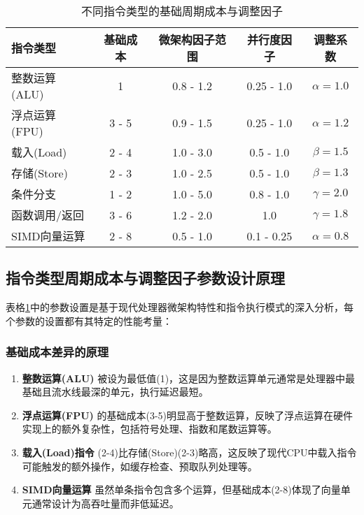 \documentclass[bachelor]{thesis-uestc}
\begin{document}
\begin{table}[htbp]
\caption{不同指令类型的基础周期成本与调整因子}
\centering
\begin{tabular}{|l|c|c|c|c|}
\hline
\textbf{指令类型} & \textbf{基础成本} & \textbf{微架构因子范围} & \textbf{并行度因子} & \textbf{调整系数} \\
\hline
整数运算(ALU) & 1 & 0.8 - 1.2 & 0.25 - 1.0 & $\alpha = 1.0$ \\
\hline
浮点运算(FPU) & 3 - 5 & 0.9 - 1.5 & 0.25 - 1.0 & $\alpha = 1.2$ \\
\hline
载入(Load) & 2 - 4 & 1.0 - 3.0 & 0.5 - 1.0 & $\beta = 1.5$ \\
\hline
存储(Store) & 2 - 3 & 1.0 - 2.5 & 0.5 - 1.0 & $\beta = 1.3$ \\
\hline
条件分支 & 1 - 2 & 1.0 - 5.0 & 0.8 - 1.0 & $\gamma = 2.0$ \\
\hline
函数调用/返回 & 3 - 6 & 1.2 - 2.0 & 1.0 & $\gamma = 1.8$ \\
\hline
SIMD向量运算 & 2 - 8 & 0.5 - 1.0 & 0.1 - 0.25 & $\alpha = 0.8$ \\
\hline
\end{tabular}
\label{tab:instr_costs}
\end{table}

\subsection{指令类型周期成本与调整因子参数设计原理}

表格\ref{tab:instr_costs}中的参数设置是基于现代处理器微架构特性和指令执行模式的深入分析，每个参数的设置都有其特定的性能考量：

\subsubsection{基础成本差异的原理}

\begin{enumerate}
    \item \textbf{整数运算(ALU)} 被设为最低值(1)，这是因为整数运算单元通常是处理器中最基础且流水线最深的单元，执行延迟最短。
    
    \item \textbf{浮点运算(FPU)} 的基础成本(3-5)明显高于整数运算，反映了浮点运算在硬件实现上的额外复杂性，包括符号处理、指数和尾数运算等。
    
    \item \textbf{载入(Load)指令} (2-4)比存储(Store)(2-3)略高，这反映了现代CPU中载入指令可能触发的额外操作，如缓存检查、预取队列处理等。
    
    \item \textbf{SIMD向量运算} 虽然单条指令包含多个运算，但基础成本(2-8)体现了向量单元通常设计为高吞吐量而非低延迟。
\end{enumerate}
\end{document}
